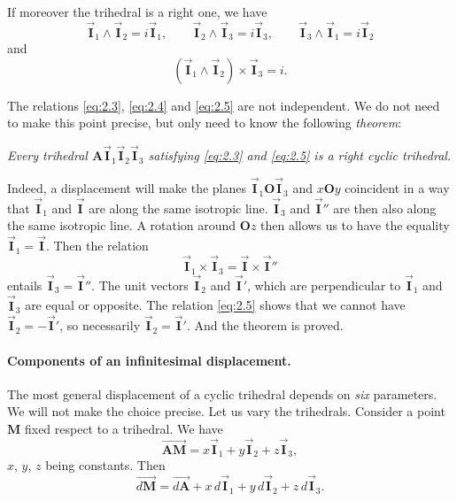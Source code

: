 \documentclass[leqno,11pt]{book}
\numberwithin{equation}{chapter}
\theoremstyle{shape1}
\theoremstyle{shapesmall}
\newcommand{\rvec}[1]{\vec{\mathbf{#1}}}
\newcommand{\ivec}{\rvec{I}}
\newcommand{\somespace}{\vspace{9pt}}
\begin{document}
If moreover the trihedral is a right one, we have
\begin{equation}
  \label{eq:2.4}
  \ivec_{1}\wedge\ivec_{2}=i\ivec_{1},\qquad\ivec_{2}\wedge\ivec_{3}=i\ivec_{3},\qquad\ivec_{3}\wedge\ivec_{1}=i\ivec_{2}
\end{equation}
and
\begin{equation}
  \label{eq:2.5}
  (\ivec_{1}\wedge\ivec_{2})\times\ivec_{3}=i.
\end{equation}

The relations \eqref{eq:2.3}, \eqref{eq:2.4} and \eqref{eq:2.5} are not independent. We do not need to make this point precise, but only need to know the following \emph{theorem}:

\somespace

\emph{Every trihedral $\mathbf{A}\ivec_{1}\ivec_{2}\ivec_{3}$ satisfying \eqref{eq:2.3} and \eqref{eq:2.5} is a right cyclic trihedral.}

\somespace

Indeed, a displacement will make the planes $\ivec_{1}\mathbf{O}\ivec_{3}$ and $x\mathbf{O}y$ coincident in a way that $\ivec_{1}$ and $\ivec$ are along the same isotropic line. $\ivec_{3}$ and $\ivec''$ are then also along the same isotropic line. A rotation around $\mathbf{O}z$ then allows us to have the equality $\ivec_{1}=\ivec$. Then the relation
\[
\ivec_{1}\times\ivec_{3}=\ivec\times\ivec''
\]
entails $\ivec_{3}=\ivec''$. The unit vectors $\ivec_{2}$ and $\ivec'$, which are perpendicular to $\ivec_{1}$ and $\ivec_{3}$ are equal or opposite. The relation \eqref{eq:2.5} shows that we cannot have $\ivec_{2}=-\ivec'$, so necessarily $\ivec_{2}=\ivec'$. And the theorem is proved.

\paragraph{Components of an infinitesimal displacement.}
\label{sec:24}
The most general displacement of a cyclic trihedral depends on \emph{six} parameters. We will not make the choice precise. Let us vary the trihedrals. Consider a point $\mathbf{M}$ fixed respect to a trihedral. We have
\[
\overrightarrow{\mathbf{AM}}=x\ivec_{1}+y\ivec_{2}+z\ivec_{3},
\]
$x$, $y$, $z$ being constants. Then
\[
\overrightarrow{d\mathbf{M}}=\overrightarrow{d\mathbf{A}}+x\,d\ivec_{1}+y\,d\ivec_{2}+z\,d\ivec_{3}.
\]
\end{document}
